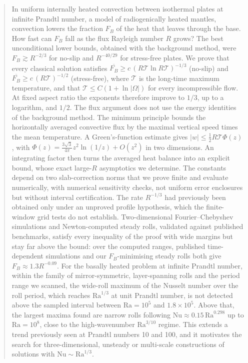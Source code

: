 \begin{abstract}
In uniform internally heated convection between isothermal plates at infinite Prandtl number, a model of
radiogenically heated mantles, convection lowers the fraction $F_B$ of the heat that leaves through the base.
How fast can $F_B$ fall as the flux Rayleigh number $R$ grows? The best unconditional lower bounds, obtained with
the background method, were $F_B\gtrsim R^{-2/3}$ for no-slip and $R^{-40/29}$ for stress-free plates. We prove that
every classical solution satisfies $\overline{F_B}\ge c\,(R\mathcal T\ln R\mathcal T)^{-1/3}$ (no-slip) and
$\overline{F_B}\ge c\,(R\mathcal T)^{-1/2}$ (stress-free), where $\mathcal T$ is the long-time maximum
temperature, and that $\mathcal T\le C(1+\ln|\Omega|)$ for every incompressible flow. At fixed aspect ratio the
exponents therefore improve to $1/3$, up to a logarithm, and $1/2$. The flux argument does not use the energy
identities of the background method. The minimum principle bounds the horizontally averaged convective flux by
the maximal vertical speed times the mean temperature. A Green's-function estimate gives
$|w|\le\frac12R\mathcal T\Phi(z)$, with $\Phi(z)=\frac{3\sqrt3}{4\pi}z^2\ln(1/z)+O(z^2)$ in two dimensions. An
integrating factor then turns the averaged heat balance into an explicit bound, whose exact large-$R$ asymptotics
we determine. The constants depend on two slab-correction norms that we prove finite and evaluate numerically,
with numerical sensitivity checks, not uniform error enclosures but without interval certification. The rate $R^{-1/3}$ had previously been obtained only under
an unproved profile hypothesis, which the finite-window grid tests do not establish. Two-dimensional
Fourier--Chebyshev simulations and Newton-computed steady rolls, validated against published benchmarks, satisfy
every inequality of the proof with wide margins but stay far above the bound: over the computed ranges, published
time-dependent simulations and our $F_B$-minimising steady rolls both give $F_B\approx1.3R^{-0.09}$. For the basally heated problem at
infinite Prandtl number, within the family of mirror-symmetric, layer-spanning rolls and the period range we
scanned, the wide-roll maximum of the Nusselt number over the roll period, which reaches $\mathrm{Ra}^{1/3}$ at
unit Prandtl number, is not detected above the sampled interval between $\mathrm{Ra}=10^5$ and $1.8\times10^5$. Above that, the largest maxima
found are narrow rolls following $\mathrm{Nu}\approx0.15\,\mathrm{Ra}^{0.298}$ up to $\mathrm{Ra}=10^8$, close to
the high-wavenumber $\mathrm{Ra}^{3/10}$ regime. This extends a trend previously seen at Prandtl numbers 10 and
100, and it motivates the search for three-dimensional, unsteady or multi-scale constructions of solutions with
$\mathrm{Nu}\sim\mathrm{Ra}^{1/3}$.
\end{abstract}
